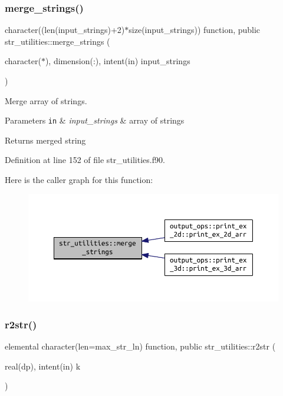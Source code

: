 \subsubsection{\texorpdfstring{merge\+\_\+strings()}{merge\_strings()}}
{\footnotesize\ttfamily character((len(input\+\_\+strings)+2)$\ast$size(input\+\_\+strings)) function, public str\+\_\+utilities\+::merge\+\_\+strings (\begin{DoxyParamCaption}\item[{character($\ast$), dimension(\+:), intent(in)}]{input\+\_\+strings }\end{DoxyParamCaption})}



Merge array of strings. 


\begin{DoxyParams}[1]{Parameters}
\mbox{\tt in}  & {\em input\+\_\+strings} & array of strings\\
\hline
\end{DoxyParams}
\begin{DoxyReturn}{Returns}
merged string 
\end{DoxyReturn}


Definition at line 152 of file str\+\_\+utilities.\+f90.

Here is the caller graph for this function\+:\nopagebreak
\begin{figure}[H]
\begin{center}
\leavevmode
\includegraphics[width=350pt]{namespacestr__utilities_a6ab16f33c155db79844279c6a56a494c_icgraph}
\end{center}
\end{figure}
\mbox{\label{namespacestr__utilities_a92ac6c0af1979df094de1caddd28ade0}} 
\subsubsection{\texorpdfstring{r2str()}{r2str()}}
{\footnotesize\ttfamily elemental character(len=max\+\_\+str\+\_\+ln) function, public str\+\_\+utilities\+::r2str (\begin{DoxyParamCaption}\item[{real(dp), intent(in)}]{k }\end{DoxyParamCaption})}



